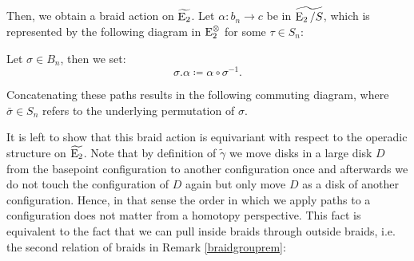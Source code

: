 \begin{const}
Then, we obtain a braid action on $\widetilde{\operatorname{E}_2}$. Let $\alpha \colon b_n \to
c$ be in $\widetilde{\operatorname{E}_2 \slash S}$, which is represented by the following
diagram in $\operatorname{\operatorname{E}_2^{\otimes}}$ for some $\tau \in S_n$:

\begin{center}
\end{center}

Let $\sigma \in B_n$, then we set:
\[
    \sigma . \alpha \coloneq \alpha \circ \sigma^{-1}.
\]

Concatenating these paths results in the following commuting diagram, where
$\bar{\sigma} \in S_n$ refers to the underlying permutation of $\sigma$.

\begin{center}
\end{center}

It is left to show that this braid action is equivariant with respect to
the operadic structure on $\widetilde{\operatorname{E}_2}$. Note that by
definition of $\widetilde{\gamma}$ we move disks in a large disk $D$ from the
basepoint configuration to another configuration once and afterwards we do not touch the
configuration of $D$ again but only move $D$ as a disk of another
configuration.
Hence, in that sense the order in which we apply paths to a
configuration does not matter from a homotopy perspective. This fact is
equivalent to the fact that we can pull inside braids through outside braids,
i.e. the second relation of braids in Remark \ref{braidgrouprem}:
\begin{center}
\end{center}
\end{const}
